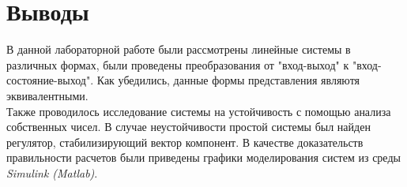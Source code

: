 \documentclass[12pt]{article}
\begin{document}
\section*{Выводы}
В данной лабораторной работе были рассмотрены линейные системы в различных формах, были проведены преобразования от "вход-выход" к "вход-состояние-выход". Как убедились, данные формы представления являютя эквивалентными. \\
Также проводилось исследование системы на устойчивость с помощью анализа собственных чисел. В случае неустойчивости простой системы был найден регулятор, стабилизирующий вектор компонент. В качестве доказательств правильности расчетов были приведены графики моделирования систем из среды \emph{Simulink (Matlab)}.
\end{document}
